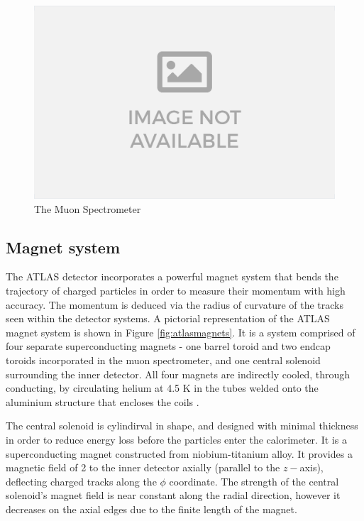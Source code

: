 \begin{figure}
    \centering
    \includegraphics[width=\smallfigwidth]{Figures/no-image.png}
    \caption{The Muon Spectrometer}
    \label{fig:muonspectrometer}
\end{figure}

\subsection{Magnet system}

The ATLAS detector incorporates a powerful magnet system that bends the trajectory of charged particles in order to measure their momentum with high accuracy. The momentum is deduced via the radius of curvature of the tracks seen within the detector systems. A pictorial representation of the ATLAS magnet system is shown in Figure \ref{fig:atlasmagnets}. It is a system comprised of four separate superconducting magnets - one barrel toroid and two endcap toroids incorporated in the muon spectrometer, and one central solenoid surrounding the inner detector. All four magnets are indirectly cooled, through conducting, by circulating helium at 4.5 K in the tubes welded onto the aluminium structure that encloses the coils \cite{828245}. 

The central solenoid is cylindirval in shape, and designed with minimal thickness in order to reduce energy loss before the particles enter the calorimeter. It is a superconducting magnet constructed from niobium-titanium alloy. It provides a magnetic field of \unit{2}{\tesla} to the inner detector axially (parallel to the $z-$axis), deflecting charged tracks along the $\phi$ coordinate. The strength of the central solenoid's magnet field is near constant along the radial direction, however it decreases on the axial edges due to the finite length of the magnet. 

